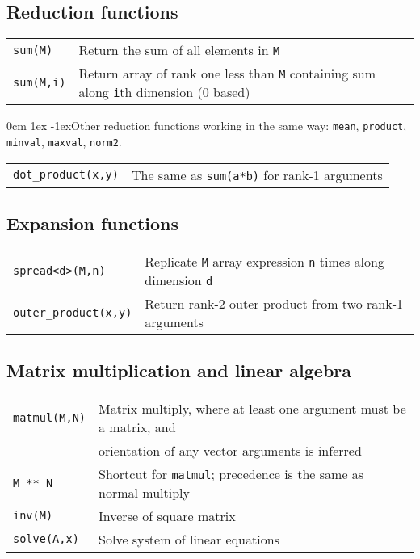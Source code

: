 \documentclass[10pt,a4,landscape]{article}
\def\hangingpar{\parshape 2 0cm \linewidth 1ex \dimexpr\linewidth-1ex\relax}
\def\code#1{\texttt{#1}}
\begin{document}
\subsection*{Reduction functions}
\begin{tabular}{ll}
\code{sum(M)} & Return the sum of all elements in \code{M}\\
\code{sum(M,i)} & Return array of rank one less than \code{M} containing sum along \code{i}th dimension (0 based)\\
\end{tabular}

\hangingpar Other reduction functions working in the same way:
\code{mean}, \code{product}, \code{minval}, \code{maxval}, \code{norm2}.

\begin{tabular}{ll}
\code{dot\_product(x,y)} & The same as \code{sum(a*b)} for rank-1
arguments\\
\end{tabular}
\subsection*{Expansion functions}
\begin{tabular}{ll}
\code{spread<d>(M,n)} & Replicate \code{M} array expression \code{n}
times along dimension \code{d}\\
\code{outer\_product(x,y)} & Return rank-2 outer product from two
rank-1 arguments\\
\end{tabular}
\subsection*{Matrix multiplication and linear algebra}
\begin{tabular}{ll}
\code{matmul(M,N)} & Matrix multiply, where at least one argument must
be a matrix, and \\
&orientation of any vector arguments is inferred\\
\code{M ** N} & Shortcut for \code{matmul}; precedence is the same as normal
  multiply\\
\code{inv(M)} & Inverse of square matrix\\
\code{solve(A,x)} & Solve system of linear equations\\ 
\end{tabular}
\end{document}
